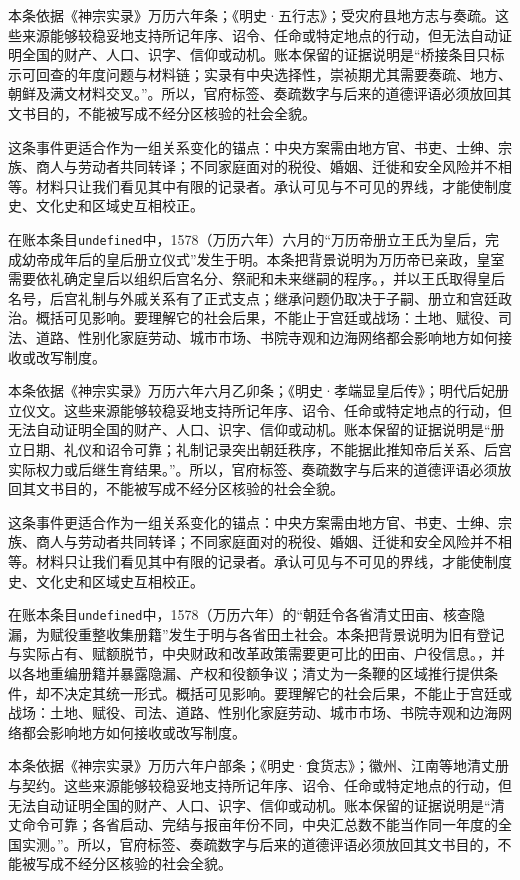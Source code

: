 本条依据《神宗实录》万历六年条；《明史·五行志》；受灾府县地方志与奏疏。这些来源能够较稳妥地支持所记年序、诏令、任命或特定地点的行动，但无法自动证明全国的财产、人口、识字、信仰或动机。账本保留的证据说明是“桥接条目只标示可回查的年度问题与材料链；实录有中央选择性，崇祯期尤其需要奏疏、地方、朝鲜及满文材料交叉。”。所以，官府标签、奏疏数字与后来的道德评语必须放回其文书目的，不能被写成不经分区核验的社会全貌。

这条事件更适合作为一组关系变化的锚点：中央方案需由地方官、书吏、士绅、宗族、商人与劳动者共同转译；不同家庭面对的税役、婚姻、迁徙和安全风险并不相等。材料只让我们看见其中有限的记录者。承认可见与不可见的界线，才能使制度史、文化史和区域史互相校正。

在账本条目\texttt{undefined}中，1578（万历六年）六月的“万历帝册立王氏为皇后，完成幼帝成年后的皇后册立仪式”发生于明。本条把背景说明为万历帝已亲政，皇室需要依礼确定皇后以组织后宫名分、祭祀和未来继嗣的程序。，并以王氏取得皇后名号，后宫礼制与外戚关系有了正式支点；继承问题仍取决于子嗣、册立和宫廷政治。概括可见影响。要理解它的社会后果，不能止于宫廷或战场：土地、赋役、司法、道路、性别化家庭劳动、城市市场、书院寺观和边海网络都会影响地方如何接收或改写制度。

本条依据《神宗实录》万历六年六月乙卯条；《明史·孝端显皇后传》；明代后妃册立仪文。这些来源能够较稳妥地支持所记年序、诏令、任命或特定地点的行动，但无法自动证明全国的财产、人口、识字、信仰或动机。账本保留的证据说明是“册立日期、礼仪和诏令可靠；礼制记录突出朝廷秩序，不能据此推知帝后关系、后宫实际权力或后继生育结果。”。所以，官府标签、奏疏数字与后来的道德评语必须放回其文书目的，不能被写成不经分区核验的社会全貌。

这条事件更适合作为一组关系变化的锚点：中央方案需由地方官、书吏、士绅、宗族、商人与劳动者共同转译；不同家庭面对的税役、婚姻、迁徙和安全风险并不相等。材料只让我们看见其中有限的记录者。承认可见与不可见的界线，才能使制度史、文化史和区域史互相校正。

在账本条目\texttt{undefined}中，1578（万历六年）的“朝廷令各省清丈田亩、核查隐漏，为赋役重整收集册籍”发生于明与各省田土社会。本条把背景说明为旧有登记与实际占有、赋额脱节，中央财政和改革政策需要更可比的田亩、户役信息。，并以各地重编册籍并暴露隐漏、产权和役额争议；清丈为一条鞭的区域推行提供条件，却不决定其统一形式。概括可见影响。要理解它的社会后果，不能止于宫廷或战场：土地、赋役、司法、道路、性别化家庭劳动、城市市场、书院寺观和边海网络都会影响地方如何接收或改写制度。

本条依据《神宗实录》万历六年户部条；《明史·食货志》；徽州、江南等地清丈册与契约。这些来源能够较稳妥地支持所记年序、诏令、任命或特定地点的行动，但无法自动证明全国的财产、人口、识字、信仰或动机。账本保留的证据说明是“清丈命令可靠；各省启动、完结与报亩年份不同，中央汇总数不能当作同一年度的全国实测。”。所以，官府标签、奏疏数字与后来的道德评语必须放回其文书目的，不能被写成不经分区核验的社会全貌。

